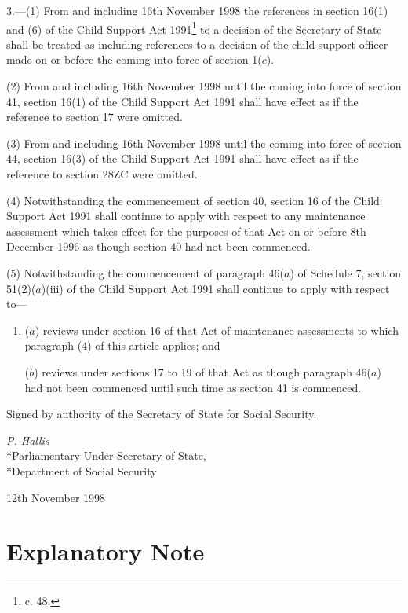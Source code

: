 \documentclass[12pt,a4paper]{article}
\begin{document}
3.—(1) From and including 16th November 1998 the references in section 16(1) and (6) of the Child Support Act 1991\footnote{ c. 48.} to a decision of the Secretary of State shall be treated as including references to a decision of the child support officer made on or before the coming into force of section 1($c$).

(2) From and including 16th November 1998 until the coming into force of section 41, section 16(1) of the Child Support Act 1991 shall have effect as if the reference to section 17 were omitted.

(3) From and including 16th November 1998 until the coming into force of section 44, section 16(3) of the Child Support Act 1991 shall have effect as if the reference to section 28ZC were omitted.

(4) Notwithstanding the commencement of section 40, section 16 of the Child Support Act 1991 shall continue to apply with respect to any maintenance assessment which takes effect for the purposes of that Act on or before 8th December 1996 as though section 40 had not been commenced.

(5) Notwithstanding the commencement of paragraph 46($a$) of Schedule 7, section 51(2)($a$)(iii) of the Child Support Act 1991 shall continue to apply with respect to---
\begin{enumerate}\item[]
($a$) reviews under section 16 of that Act of maintenance assessments to which paragraph (4) of this article applies; and

($b$) reviews under sections 17 to 19 of that Act as though paragraph 46($a$) had not been commenced until such time as section 41 is commenced.
\end{enumerate}

\bigskip

Signed 
by authority of the Secretary of State for Social Security.

{\raggedleft
\emph{P. Hallis}\\*Parliamentary Under-Secretary of State,\\*Department of Social Security

}

12th November 1998

\small

\part{Explanatory Note}
\end{document}
